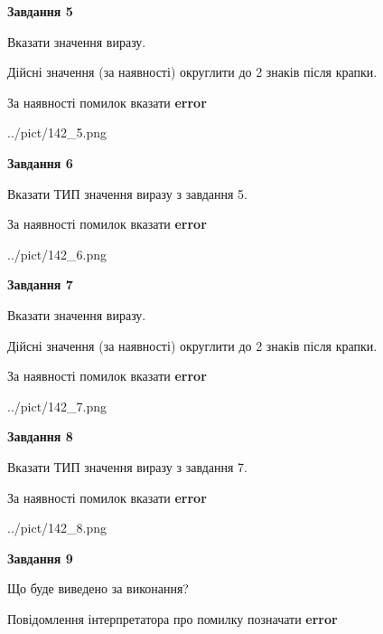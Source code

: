 \documentclass[11pt, ukrainian]{article}
\begin{document}
{\begin {large}
{\begin {center}\textbf{Завдання 5}\end {center}}\par
Вказати значення виразу. \par
Дійсні значення (за наявності) округлити до 2 знаків після крапки. \par
За наявності помилок вказати \textbf{error}

\begin{center}
	{../pict/142_5.png}
\end{center}
\newpage

{\begin {center}\textbf{Завдання 6}\end {center}}\par
Вказати ТИП значення виразу з завдання 5. \par
За наявності помилок вказати \textbf{error}

\begin{center}
	{../pict/142_6.png}
\end{center}
\newpage

{\begin {center}\textbf{Завдання 7}\end {center}}\par
Вказати значення виразу. \par
Дійсні значення (за наявності) округлити до 2 знаків після крапки. \par
За наявності помилок вказати \textbf{error}

\begin{center}
	{../pict/142_7.png}
\end{center}
\newpage

{\begin {center}\textbf{Завдання 8}\end {center}}\par
Вказати ТИП значення виразу з завдання 7. \par
За наявності помилок вказати \textbf{error}

\begin{center}
	{../pict/142_8.png}
\end{center}
\newpage

{\begin {center}\textbf{Завдання 9}\end {center}}\par
Що буде виведено за виконання? \par
Повідомлення інтерпретатора про помилку позначати \textbf{error}


\end{large}}
\end{document}
